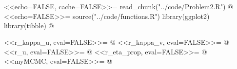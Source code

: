 \section{}
\label{sec:ex2}
<<echo=FALSE, cache=FALSE>>=
read_chunk("../code/Problem2.R")
@
<<echo=FALSE>>=
source("../code/functions.R")
library(ggplot2)
library(tibble)
@

%
<<r_kappa_u, eval=FALSE>>=
@
%
%
<<r_kappa_v, eval=FALSE>>=
@
%
%
<<r_u, eval=FALSE>>=
@
%
%
<<r_eta_prop, eval=FALSE>>=
@
%
%
<<myMCMC, eval=FALSE>>=
@
%